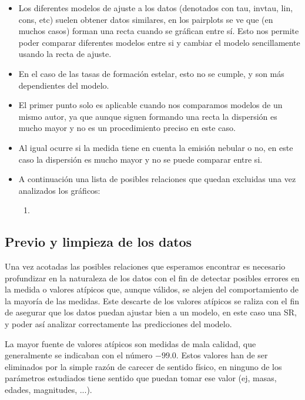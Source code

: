 \documentclass[11pt, a4paper]{article} %
\begin{document}
\begin{itemize}
    \item Los diferentes modelos de ajuste a los datos (denotados con tau, invtau, lin, cons, etc) 
    suelen obtener datos similares, en los pairplots se ve que (en muchos casos) forman una recta cuando se gráfican entre sí. Esto nos permite poder comparar diferentes modelos entre si y cambiar el modelo sencillamente usando la recta de ajuste.
    \item En el caso de las tasas de formación estelar, esto no se cumple, y son más dependientes del modelo.
    \item El primer punto solo es aplicable cuando nos comparamos modelos de un mismo autor, ya que aunque siguen formando una recta la dispersión es mucho mayor y no es un procedimiento preciso en este caso.
    \item Al igual ocurre si la medida tiene en cuenta la emisión nebular o no, en este caso la dispersión es mucho mayor y no se puede comparar entre si.
    \item A continuación una lista de posibles relaciones que quedan excluidas una vez analizados los gráficos:
    \begin{enumerate}
        \item 
    \end{enumerate}
\end{itemize}



\subsection{Previo y limpieza de los datos}

Una vez acotadas las posibles relaciones que esperamos encontrar es necesario profundizar en la naturaleza de los datos con 
el fin de detectar posibles errores en la medida o valores atípicos que, aunque válidos, se alejen del comportamiento de la mayoría de las medidas. 
Este descarte de los valores atípicos se raliza con el fin de asegurar que los datos puedan ajustar bien a un modelo, en este caso una SR, y poder así analizar 
correctamente las predicciones del modelo. 

La mayor fuente de valores atípicos son medidas de mala calidad, que generalmente se indicaban con el número $-99.0$. Estos valores han de ser eliminados por la simple razón de carecer de sentido físico, en ninguno de los parámetros estudiados tiene sentido que puedan tomar ese valor (ej, masas, edades, magnitudes, ...). 
\end{document}
